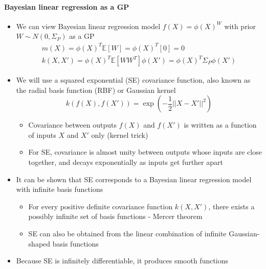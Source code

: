 \documentclass[12pt]{article}
\begin{document}
\paragraph{Bayesian linear regression as a GP}
\begin{itemize}
    \item We can view Bayesian linear regression model $f(X) = \phi(X)^W$ with prior $W \sim N(0, \Sigma_P)$ as a GP 
\begin{equation}
    \begin{aligned}
        m(X) = \phi(X)^T\mathbb{E}[W] = \phi(X)^T[0] = 0 \\
        k(X,X') = \phi(X)^T\mathbb{E}[WW^T]\phi(X') = \phi(X)^T\Sigma_P\phi(X')
    \end{aligned}
\end{equation}
    \item We will use a squared exponential (SE) covariance function, also known as the radial basis function (RBF) or Gaussian kernel
\begin{equation}
    k(f(X), f(X')) = \exp\left(-\frac{1}{2}||X - X'||^2\right)
\end{equation}
    \begin{itemize}
        \item Covariance between outputs $f(X)$ and $f(X')$ is written as a function of inputs $X$ and $X'$ only (kernel trick)
        \item For SE, covariance is almost unity between outputs whose inputs are close together, and decays exponentially as inputs get further apart
    \end{itemize}
    \item It can be shown that SE corresponds to a Bayesian linear regression model with infinite basis functions
        \begin{itemize}
            \item For every positive definite covariance function $k(X,X')$, there exists a possibly infinite set of basis functions - Mercer theorem
            \item SE can also be obtained from the linear combination of infinite Gaussian-shaped basis functions
        \end{itemize}
    \item Because SE is infinitely differentiable, it produces smooth functions
\end{itemize}
\end{document}

